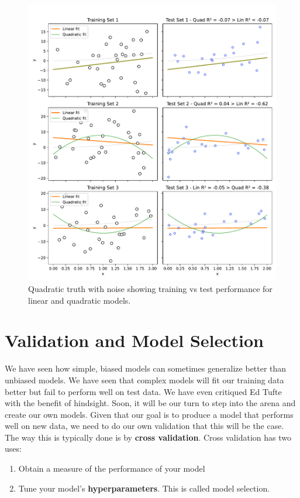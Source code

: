 \begin{figure}[H]
\centering
\includegraphics[width=\textwidth]{images/scatter_bias_variance.pdf}
\caption{Quadratic truth with noise showing training vs test performance for linear and quadratic models.}
\label{fig:bias-variance}
\end{figure}

\section{Validation and Model Selection}

We have seen how simple, biased models can sometimes generalize better than unbiased models. We have seen that complex models will fit our training data better but fail to perform well on test data. We have even critiqued Ed Tufte with the benefit of hindsight. Soon, it will be our turn to step into the arena and create our own models. Given that our goal is to produce a model that performs well on new data, we need to do our own validation that this will be the case. The way this is typically done is by \textbf{cross validation}. Cross validation has two uses:

\begin{enumerate}
\item Obtain a measure of the performance of your model
\item Tune your model's \textbf{hyperparameters}. This is called model selection.
\end{enumerate}

